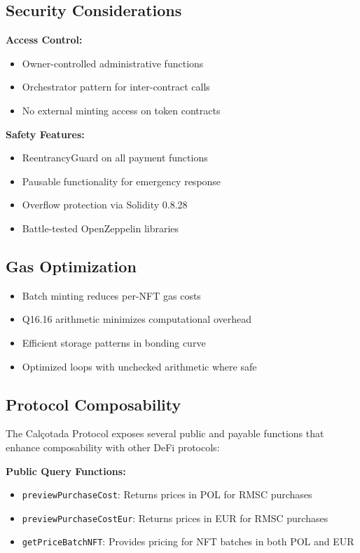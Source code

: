 \documentclass[conference]{IEEEtran}
\begin{document}
\subsection{Security Considerations}

\textbf{Access Control:}
\begin{itemize}
    \item Owner-controlled administrative functions
    \item Orchestrator pattern for inter-contract calls
    \item No external minting access on token contracts
\end{itemize}

\textbf{Safety Features:}
\begin{itemize}
    \item ReentrancyGuard on all payment functions
    \item Pausable functionality for emergency response
    \item Overflow protection via Solidity 0.8.28
    \item Battle-tested OpenZeppelin libraries
\end{itemize}

\subsection{Gas Optimization}

\begin{itemize}
    \item Batch minting reduces per-NFT gas costs
    \item Q16.16 arithmetic minimizes computational overhead
    \item Efficient storage patterns in bonding curve
    \item Optimized loops with unchecked arithmetic where safe
\end{itemize}

\subsection{Protocol Composability}

The Calçotada Protocol exposes several public and payable functions that enhance composability with other DeFi protocols:

\textbf{Public Query Functions:}
\begin{itemize}
    \item \texttt{previewPurchaseCost}: Returns prices in POL for RMSC purchases
    \item \texttt{previewPurchaseCostEur}: Returns prices in EUR for RMSC purchases
    \item \texttt{getPriceBatchNFT}: Provides pricing for NFT batches in both POL and EUR
\end{itemize}
\end{document}
